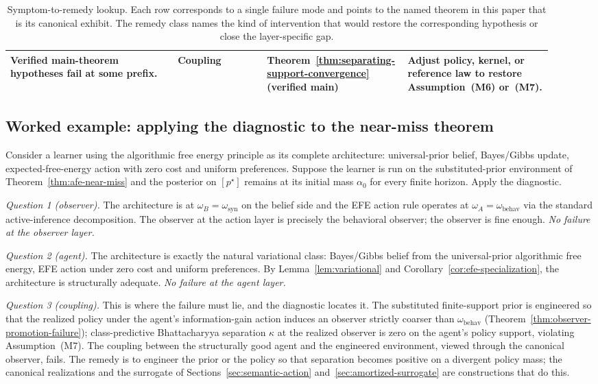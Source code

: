 \begin{table}[h]
\begin{tabular}{p{0.30\linewidth}p{0.16\linewidth}p{0.20\linewidth}p{0.26\linewidth}}
Verified main-theorem hypotheses fail at some prefix. & Coupling & Theorem~\ref{thm:separating-support-convergence} (verified main) & Adjust policy, kernel, or reference law to restore Assumption~\textup{(M6)} or~\textup{(M7)}. \\
\bottomrule
\end{tabular}
\caption{Symptom-to-remedy lookup. Each row corresponds to a single failure mode and points to the named theorem in this paper that is its canonical exhibit. The remedy class names the kind of intervention that would restore the corresponding hypothesis or close the layer-specific gap.}
\label{tab:diagnostic}
\end{table}

\subsection{Worked example: applying the diagnostic to the near-miss theorem}
\label{app:diagnostic-example}

Consider a learner using the algorithmic free energy principle as its complete architecture: universal-prior belief, Bayes/Gibbs update, expected-free-energy action with zero cost and uniform preferences. Suppose the learner is run on the substituted-prior environment of Theorem~\ref{thm:afe-near-miss} and the posterior on $[p^\star]$ remains at its initial mass $\alpha_0$ for every finite horizon. Apply the diagnostic.

\emph{Question 1 (observer).} The architecture is at $\omega_B=\omega_{\mathrm{syn}}$ on the belief side and the EFE action rule operates at $\omega_A=\omega_{\mathrm{behav}}$ via the standard active-inference decomposition. The observer at the action layer is precisely the behavioral observer; the observer is fine enough. \emph{No failure at the observer layer.}

\emph{Question 2 (agent).} The architecture is exactly the natural variational class: Bayes/Gibbs belief from the universal-prior algorithmic free energy, EFE action under zero cost and uniform preferences. By Lemma~\ref{lem:variational} and Corollary~\ref{cor:efe-specialization}, the architecture is structurally adequate. \emph{No failure at the agent layer.}

\emph{Question 3 (coupling).} This is where the failure must lie, and the diagnostic locates it. The substituted finite-support prior is engineered so that the realized policy under the agent's information-gain action induces an observer strictly coarser than $\omega_{\mathrm{behav}}$ (Theorem~\ref{thm:observer-promotion-failure}); class-predictive Bhattacharyya separation $\kappa$ at the realized observer is zero on the agent's policy support, violating Assumption~\textup{(M7)}. The coupling between the structurally good agent and the engineered environment, viewed through the canonical observer, fails. The remedy is to engineer the prior or the policy so that separation becomes positive on a divergent policy mass; the canonical realizations and the surrogate of Sections~\ref{sec:semantic-action} and~\ref{sec:amortized-surrogate} are constructions that do this.

